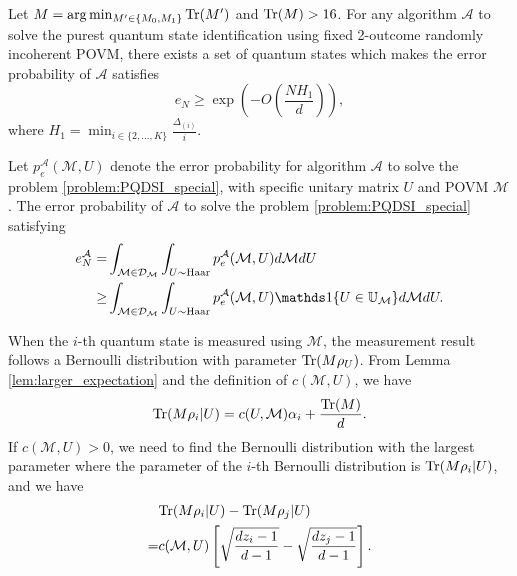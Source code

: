 \begin{theorem}
    \label{thm:PQSI lower bound}
     Let $M = \arg\min_{M' \in \{M_0,M_1\}}\mathrm{Tr}(M')$ and $\mathrm{Tr}(M) > 16$. For any algorithm $\mathcal{A}$ to solve the purest quantum state identification using fixed 2-outcome randomly incoherent POVM, there exists a set of quantum states which makes the error probability of $\mathcal{A}$ satisfies
     \begin{equation}
         e_N \geq \exp\left( - O\left( \frac{NH_1}{d}\right)\right),
     \end{equation}
     where $H_1 = \min_{i \in \{2,...,K\}} \frac{\Delta_{(i)}}{i}$.
\end{theorem}
\begin{proof-sketch}
    Let $p^{\mathcal{A}}_{e}(\mathcal{M},U)$ denote the error probability for algorithm $\mathcal{A}$ to solve the problem \ref{problem:PQDSI_special}, with specific unitary matrix $U$ and POVM $\mathcal{M}$. The error probability of $\mathcal{A}$ to solve the problem \ref{problem:PQDSI_special} satisfying
    \begin{equation*}
        \begin{aligned}
            e^\mathcal{A}_N = & \int_{\mathcal{M} \in \mathcal{D}_{\mathcal{M}}} \int_{U \sim \Haar} p^\mathcal{A}_e(\mathcal{M},U) d\mathcal{M} dU \\
            \geq & \int_{\mathcal{M} \in \mathcal{D}_{\mathcal{M}}} \int_{U \sim \Haar} p^\mathcal{A}_e(\mathcal{M},U)\indicator\{U \in \mathbb{U}_\mathcal{M}\} d\mathcal{M} dU.
        \end{aligned}
    \end{equation*}
    
When the $i$-th quantum state is measured using $\mathcal{M}$, the measurement result follows a Bernoulli distribution with parameter $\mathrm{Tr}(M\rho_U)$. From Lemma \ref{lem:larger_expectation} and the definition of $c(\mathcal{M}, U)$, we have 
    \begin{equation*}
        \mathrm{Tr}(M\rho_i|U) = c(U,\mathcal{M})\alpha_i + \frac{\mathrm{Tr}(M)}{d}.    
    \end{equation*}
    If $c(\mathcal{M}, U) >0$, we need to find the Bernoulli distribution with the largest parameter where the parameter of the $i$-th Bernoulli distribution is $\mathrm{Tr}(M\rho_i|U)$, and we have
    \begin{equation}
        \begin{aligned}
            & \mathrm{Tr}(M\rho_i|U) - \mathrm{Tr}(M\rho_j|U) \\
            = & c(\mathcal{M},U) \left[\sqrt {\frac{dz_i -1}{d-1}} - \sqrt{\frac{dz_j -1}{d-1}}\right].
        \end{aligned}
    \end{equation}
        

\end{proof-sketch}

